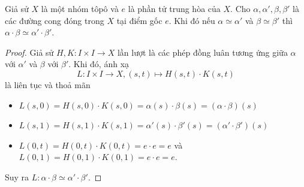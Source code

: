 \begin{lemma} 
	Giả sử $X$ là một nhóm tôpô  và  $e$ là phần tử trung hòa của $X$. Cho $\alpha,\alpha',\beta,\beta'$ là các đường cong đóng trong $X$ tại điểm gốc $e$. Khi đó nếu $\alpha\simeq\alpha'$ và $\beta\simeq\beta'$ thì $\alpha\cdot \beta \simeq \alpha'\cdot \beta'$.
\end{lemma}
 \begin{proof}
 	Giả sử $H,K:I\times I\to X$ lần lượt là các phép đồng luân tương ứng giữa $\alpha$ với $\alpha'$ và $\beta$ với $\beta'$. Khi đó, ánh xạ 
    \[L:I\times I\to X, (s,t)\mapsto H(s,t)\cdot K(s,t)\]
    là liên tục và thoả mãn 
    \begin{itemize}
        \item $L(s,0)=H(s,0)\cdot K(s,0)=\alpha(s)\cdot \beta(s) = (\alpha\cdot\beta)(s)$

        \item $L(s,1)=H(s,1)\cdot K(s,1)=\alpha'(s)\cdot \beta'(s)=(\alpha'\cdot \beta')(s)$

        \item $L(0,t)=H(0,t)\cdot K(0,t)=e\cdot e = e$ và $L(0,1)=H(0,1)\cdot K(0,1)=e\cdot e = e$.
    \end{itemize}
    Suy ra $L:\alpha\cdot \beta\simeq \alpha'\cdot \beta'$.
    \end{proof}

